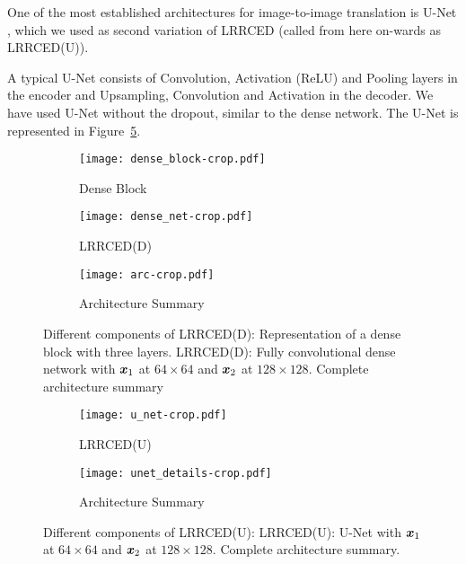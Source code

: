 One of the most established architectures for image-to-image translation is U-Net \cite{ronneberger2015u}, which we used as second variation of \ac{LRRCED} (called from here on-wards as \ac{LRRCED}(U)).
 
A typical U-Net consists of Convolution, Activation (\ac{ReLU}) and Pooling layers in the encoder and Upsampling, Convolution and Activation in the decoder. We have used U-Net without the dropout, similar to the dense network. The U-Net is represented in Figure~\ref{fig:un}. 

\begin{figure}[!htbp]
	\begin{subfigure}{.25\textwidth}
		\centering
		\texttt{[image: dense\_block-crop.pdf]}
		\caption{Dense Block}
		\label{fig:db}
	\end{subfigure}%
	\begin{subfigure}{.40\textwidth}
		\centering
		\texttt{[image: dense\_net-crop.pdf]}
		\caption{\ac{LRRCED}(D)}
		\label{fig:dn1}
	\end{subfigure}%
	\begin{subfigure}{.35\textwidth}
		\centering
		\texttt{[image: arc-crop.pdf]}
		\caption{Architecture Summary}
		\label{fig:dn2}
	\end{subfigure}%
	\caption{Different components of \ac{LRRCED}(D):  Representation of a dense block with three layers.  \ac{LRRCED}(D): Fully convolutional dense network with $\bm{x}_1$ at $64\times64$ and $\bm{x}_2$ at $128\times128$.  Complete architecture summary}
	\label{fig:den}
\end{figure}


\begin{figure}[!htbp]
	\begin{subfigure}{.60\textwidth}
		\centering
		\texttt{[image: u\_net-crop.pdf]}
		\caption{\ac{LRRCED}(U)}
		\label{fig:un}
	\end{subfigure}%
	\begin{subfigure}{.40\textwidth}
		\centering
		\texttt{[image: unet\_details-crop.pdf]}
		\caption{Architecture Summary}
		\label{fig:ud}
	\end{subfigure}%
	\caption{Different components of \ac{LRRCED}(U):  \ac{LRRCED}(U): U-Net with $\bm{x}_1$ at $64\times64$ and $\bm{x}_2$ at $128\times128$.  Complete architecture summary.}
	\label{fig:unet}
	
\end{figure}

